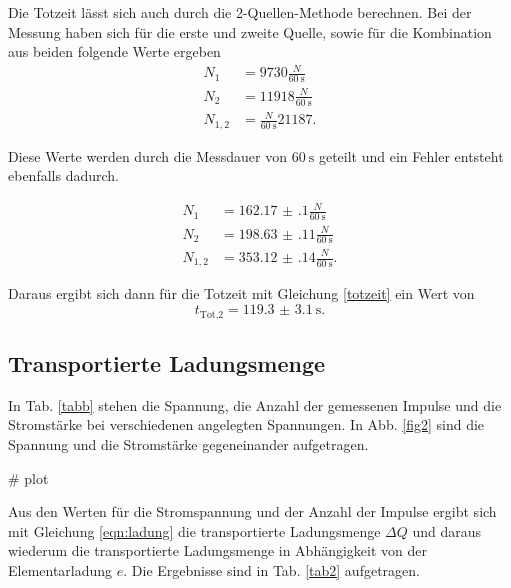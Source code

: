 
Die Totzeit lässt sich auch durch die 2-Quellen-Methode berechnen. 
Bei der Messung haben sich für die erste und zweite Quelle, sowie für die Kombination aus beiden folgende Werte ergeben
\begin{align*} 
   N_1 &= 9730 \frac{N}{\SI{60}{\second}}\\
   N_2 &= 11918 \frac{N}{\SI{60}{\second}} \\
   N_{1,2} &= \frac{N}{\SI{60}{\second}} 21187.
\end{align*}

Diese Werte werden durch die Messdauer von $\SI{60}{\second}$ geteilt und ein Fehler entsteht ebenfalls dadurch. 

\begin{align*} 
   N_1 &= \num{162.17(10)} \frac{N}{\SI{60}{\second}}\\
   N_2 &= \num{198.63(11)} \frac{N}{\SI{60}{\second}} \\
   N_{1,2} &=\num{353.12(14)} \frac{N}{\SI{60}{\second}}.
\end{align*}

Daraus ergibt sich dann für die Totzeit mit Gleichung \eqref{totzeit}
ein Wert von 
\begin{equation*} 
    t_\text{Tot,2} = \SI{119.3(31)}{\second}.
\end{equation*} 

\subsection{Transportierte Ladungsmenge}
In Tab. \ref{tabb} stehen die Spannung, die Anzahl der gemessenen Impulse und die Stromstärke bei verschiedenen angelegten Spannungen.
In Abb. \ref{fig2} sind die Spannung und die Stromstärke gegeneinander aufgetragen. 

# plot

Aus den Werten für die Stromspannung und der Anzahl der Impulse ergibt sich mit Gleichung \eqref{eqn:ladung} die transportierte Ladungsmenge $\Delta Q$ und daraus wiederum die transportierte Ladungsmenge in Abhängigkeit von der Elementarladung $e$. Die Ergebnisse sind in Tab. \ref{tab2} aufgetragen. 




